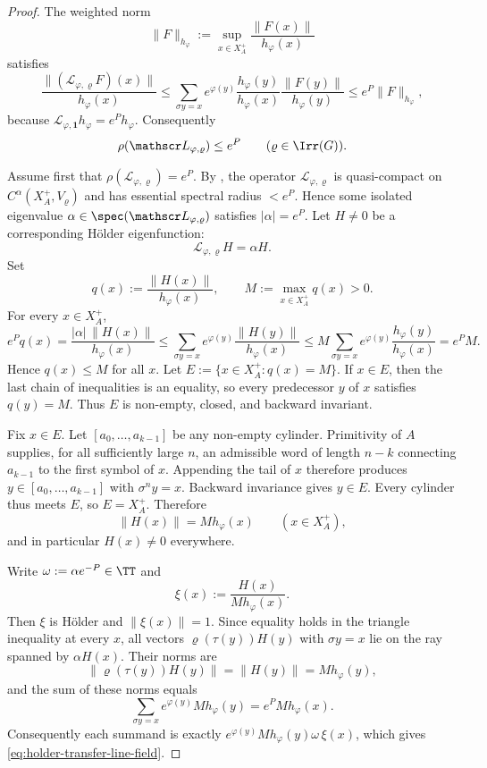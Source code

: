 \begin{proof}
  The weighted norm
  \[
    \|F\|_{h_\varphi}
    :=
    \sup_{x\in X_A^+}\frac{\|F(x)\|}{h_\varphi(x)}
  \]
  satisfies
  \[
    \frac{\|(\mathscr L_{\varphi,\varrho}F)(x)\|}{h_\varphi(x)}
    \le
    \sum_{\sigma y=x}
      e^{\varphi(y)}\frac{h_\varphi(y)}{h_\varphi(x)}
      \frac{\|F(y)\|}{h_\varphi(y)}
    \le
    e^P\|F\|_{h_\varphi},
  \]
  because \(\mathscr L_{\varphi,\mathbf 1}h_\varphi=e^P h_\varphi\).
  Consequently
  \[
    \rho(\mathscr L_{\varphi,\varrho})\le e^P
    \qquad (\varrho\in\Irr(G)).
  \]

  Assume first that \(\rho(\mathscr L_{\varphi,\varrho})=e^P\). By
  , the operator
  \(\mathscr L_{\varphi,\varrho}\) is quasi-compact on
  \(C^\alpha(X_A^+,V_\varrho)\) and has essential spectral radius
  \(<e^P\). Hence some isolated eigenvalue
  \(\alpha\in\spec(\mathscr L_{\varphi,\varrho})\) satisfies
  \(|\alpha|=e^P\). Let \(H\neq 0\) be a corresponding H\"older
  eigenfunction:
  \[
    \mathscr L_{\varphi,\varrho}H=\alpha H.
  \]
  Set
  \[
    q(x):=\frac{\|H(x)\|}{h_\varphi(x)},
    \qquad
    M:=\max_{x\in X_A^+}q(x)>0.
  \]
  For every \(x\in X_A^+\),
  \[
    e^P q(x)
    =
    \frac{|\alpha|\,\|H(x)\|}{h_\varphi(x)}
    \le
    \sum_{\sigma y=x}
      e^{\varphi(y)}\frac{\|H(y)\|}{h_\varphi(x)}
    \le
    M\sum_{\sigma y=x}
      e^{\varphi(y)}\frac{h_\varphi(y)}{h_\varphi(x)}
    =e^P M.
  \]
  Hence \(q(x)\le M\) for all \(x\). Let
  \(E:=\{x\in X_A^+:q(x)=M\}\). If \(x\in E\), then the last chain of
  inequalities is an equality, so every predecessor \(y\) of \(x\)
  satisfies \(q(y)=M\). Thus \(E\) is non-empty, closed, and backward
  invariant.

  Fix \(x\in E\). Let \([a_0,\dots,a_{k-1}]\) be any non-empty cylinder.
  Primitivity of \(A\) supplies, for all sufficiently large \(n\), an
  admissible word of length \(n-k\) connecting \(a_{k-1}\) to the first
  symbol of \(x\). Appending the tail of \(x\) therefore produces
  \(y\in[a_0,\dots,a_{k-1}]\) with \(\sigma^n y=x\). Backward invariance
  gives \(y\in E\). Every cylinder thus meets \(E\), so \(E=X_A^+\).
  Therefore
  \[
    \|H(x)\|=M h_\varphi(x)
    \qquad (x\in X_A^+),
  \]
  and in particular \(H(x)\neq 0\) everywhere.

  Write \(\omega:=\alpha e^{-P}\in\TT\) and
  \[
    \xi(x):=\frac{H(x)}{M h_\varphi(x)}.
  \]
  Then \(\xi\) is H\"older and \(\|\xi(x)\|=1\). Since equality holds in
  the triangle inequality at every \(x\), all vectors
  \(\varrho(\tau(y))H(y)\) with \(\sigma y=x\) lie on the ray spanned by
  \(\alpha H(x)\). Their norms are
  \[
    \|\varrho(\tau(y))H(y)\|
    =\|H(y)\|
    =M h_\varphi(y),
  \]
  and the sum of these norms equals
  \[
    \sum_{\sigma y=x}e^{\varphi(y)}M h_\varphi(y)
    =e^P M h_\varphi(x).
  \]
  Consequently each summand is exactly
  \(e^{\varphi(y)}M h_\varphi(y)\omega\,\xi(x)\), which gives
  \eqref{eq:holder-transfer-line-field}.


\end{proof}
